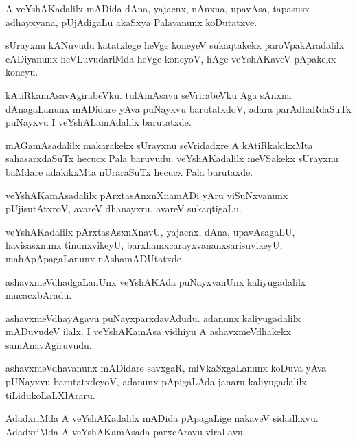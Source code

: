 \documentclass{article}
\begin{document}
\begin{mn}%
A veYshAKadalilx mADida dAna, yajacnx, nAnxna, upavAsa, tapasusx adhayxyana, pUjAdigaLu 
akaSxya Palavanunx koDutatxve.
\end{mn}

\begin{mn}%
sUrayxnu kANuvudu katatxlege  heVge koneyeV sukaqtakekx paroVpakAradalilx cADiyanunx 
heVLuvudariMda heVge koneyoV, hAge veYshAKaveV pApakekx koneyu.
\end{mn}

\begin{mn}%
kAtiRkamAsavAgirabeVku. tulAmAsavu seVrirabeVku Aga sAnxna dAnagaLanunx mADidare yAva 
puNayxvu barutatxdoV, adara parAdhaRdaSuTx puNayxvu I veYshALamAdalilx barutatxde.
\end{mn}

\begin{mn}%
mAGamAsadalilx makarakekx sUrayxnu seVridadxre A kAtiRkakikxMta sahasarxdaSuTx hecucx Pala 
baruvudu. veYshAKadalilx meVSakekx sUrayxnu baMdare adakikxMta nUraraSuTx hecucx Pala 
barutaxde.
\end{mn}

\begin{mn}%
veYshAKamAsadalilx pArxtasAnxnXnamADi yAru viSuNxvanunx pUjisutAtxroV, avareV dhanayxru. 
avareV sukaqtigaLu.
\end{mn}

\begin{mn}%
veYshAKadalilx pArxtasAsxnXnavU, yajacnx, dAna, upavAsagaLU, havisasxnunx tinunxvikeyU, 
barxhamxcarayxvananxsarisuvikeyU, mahApApagaLanunx nAshamADUtatxde.
\end{mn}

\begin{mn}%
ashavxmeVdhadgaLanUnx veYshAKAda puNayxvanUnx kaliyugadalilx mucacxbAradu.
\end{mn}

\begin{mn}%
ashavxmeVdhayAgavu puNayxparxdavAdudu. adanunx kaliyugadalilx mADuvudeV ilalx. I 
veYshAKamAsa vidhiyu A ashavxmeVdhakekx samAnavAgiruvudu.
\end{mn}

\begin{mn}%
ashavxmeVdhavanunx mADidare savxgaR, miVkaSxgaLanunx koDuva yAva pUNayxvu barutatxdeyoV, 
adanunx pApigaLAda janaru kaliyugadalilx tiLidukoLaLXlAraru.
\end{mn}

\begin{mn}%
AdadxriMda A veYshAKadalilx mADida pApagaLige nakaveV sidadhxvu. AdadxriMda A 
veYshAKamAsada parxcAravu viraLavu.
\end{mn}
\end{document}
